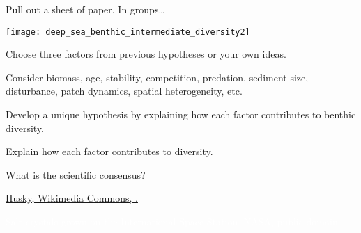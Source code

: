 \documentclass[t]{beamer}
\begin{document}
\begin{frame}[t]{Pull out a sheet of paper. In groups\dots}

	\vspace*{-\baselineskip}

	\begin{multicols}{2}

	\texttt{[image: deep\_sea\_benthic\_intermediate\_diversity2]}

	\columnbreak
	
	\hangpara Choose three factors from previous hypotheses or your own ideas.
	
	\hangpara Consider biomass, age, stability, competition, predation, sediment size, disturbance, patch dynamics, spatial heterogeneity, etc.

	\hangpara Develop a unique hypothesis by explaining how each factor contributes to benthic diversity. 
	
	\hangpara Explain how each factor contributes to diversity. 

	\end{multicols}

\end{frame}

%


\begin{frame}[t]{What is the scientific consensus?}

\hangpara{}

\vspace*{2\baselineskip}

\hangpara{}

\vspace*{2\baselineskip}

\hangpara{}

\end{frame}

%


{
\begin{frame}

\tinyfill \href{https://en.m.wikipedia.org/wiki/File:Upload_free_image_notext.svg}{Husky, Wikimedia Commons, .}

\end{frame}
}

%


%

{
\begin{frame}
\tiny \hfill \textcolor{white}{Salt crystals grown on the International Space Station. NASA, public domain.}

\vfilll

\end{frame}
}
\end{document}
